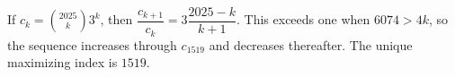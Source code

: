 If $c_k=\binom{2025}{k}3^k$, then $\dfrac{c_{k+1}}{c_k}=3\dfrac{2025-k}{k+1}$. This exceeds one when $6074>4k$, so the sequence increases through $c_{1519}$ and decreases thereafter. The unique maximizing index is $\boxed{1519}$.
